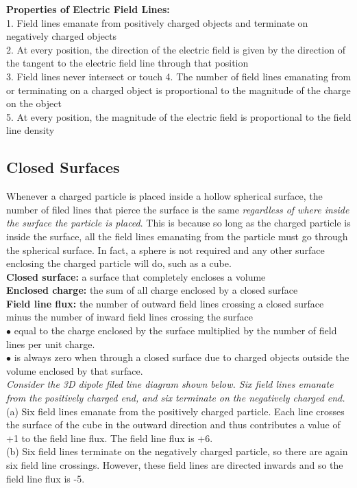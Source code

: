         \textbf{Properties of Electric Field Lines:} \\
        1. Field lines emanate from positively charged objects and terminate on negatively charged objects \\
        2. At every position, the direction of the electric field is given by the direction of the tangent to the electric field line through that position \\
        3. Field lines never intersect or touch
        4. The number of field lines emanating from or terminating on a charged object is proportional to the magnitude of the charge on the object \\
        5. At every position, the magnitude of the electric field is proportional to the field line density

    \subsection{Closed Surfaces}        %

        Whenever a charged particle is placed inside a hollow spherical surface, the number of filed lines that pierce the surface is the same \textit{regardless of where inside the surface the particle is placed}.
        This is because so long as the charged particle is inside the surface, all the field lines emanating from the particle must go through the spherical surface. In fact, a sphere is not required and any other surface
        enclosing the charged particle will do, such as a cube. \\

        \textbf{Closed surface:} a surface that completely encloses a volume \\
        \textbf{Enclosed charge:} the sum of all charge enclosed by a closed surface \\
        \textbf{Field line flux:} the number of outward field lines crossing a closed surface minus the number of inward field lines crossing the surface \\
        $\bullet$ equal to the charge enclosed by the surface multiplied by the number of field lines per unit charge. \\
        $\bullet$ is always zero when through a closed surface due to charged objects outside the volume enclosed by that surface. \\

        \textit{ Consider the 3D dipole filed line diagram shown below. Six field lines emanate from the positively charged end, and six terminate on the negatively charged end.} \\
        (a) Six field lines emanate from the positively charged particle. Each line crosses the surface of the cube in the outward direction and thus contributes a value of +1 to the field line flux. The field line flux
        is +6. \\
        (b) Six field lines terminate on the negatively charged particle, so there are again six field line crossings. However, these field lines are directed inwards and so the field line flux is -5.

